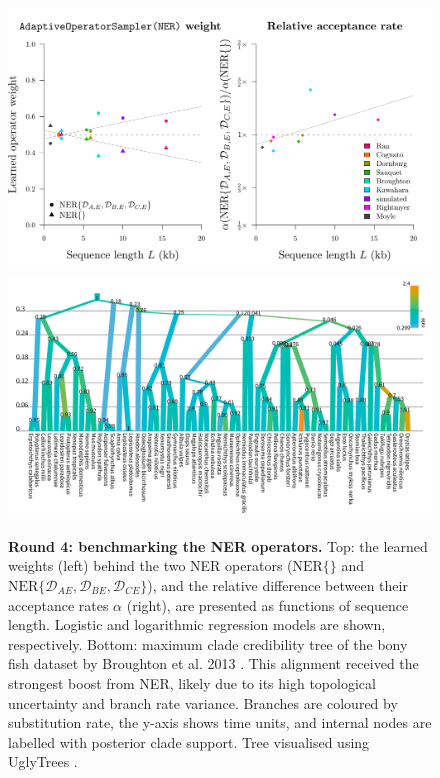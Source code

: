 \documentclass[10pt,letterpaper]{article}
\begin{document}
\begin{figure}[!h]
\includegraphics[width=\textwidth]{benchmarking/benchmarkingVM/ESS_round4.pdf}
\includegraphics[width=\textwidth]{Figures/broughton.pdf}
\caption{\textbf{Round 4: benchmarking the NER operators.} 
Top: the learned weights (left) behind the two NER operators ($\text{NER} \{\}$ and $\text{NER}\{\mathcal{D}_{AE}, \mathcal{D}_{BE}, \mathcal{D}_{CE}\}$), and the relative difference between their acceptance rates $\alpha$ (right), are presented as functions of sequence length.
Logistic and logarithmic regression models are shown, respectively.
Bottom: maximum clade credibility tree of the bony fish dataset by Broughton et al. 2013 \cite{Broughton_2013}.
This alignment received the strongest boost from NER, likely due to its high topological uncertainty and branch rate variance.  
Branches are coloured by substitution rate, the y-axis shows time units, and internal nodes are labelled with posterior clade support.  
Tree visualised using UglyTrees \cite{uglytrees}.}
\label{fig:round4Results}
\end{figure}
\end{document}
